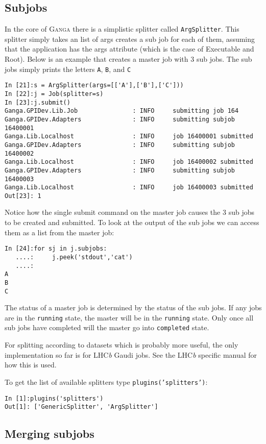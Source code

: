 \documentclass{howto}
\def\ganga {\textsc{Ganga}\xspace}
\def\lhcb {LHC{\em b\/}\xspace}
\begin{document}
\subsection{Subjobs}
\label{sec:subjobs}

In the core of \ganga there is a simplistic splitter called
\texttt{ArgSplitter}. This splitter simply takes an list of args
creates a sub job for each of them, assuming that the application has
the args attribute (which is the case of Executable and Root).  Below
is an example that creates a master job with 3 sub jobs. The sub jobs
simply prints the letters \texttt{A}, \texttt{B}, and \texttt{C}
\begin{verbatim}
In [21]:s = ArgSplitter(args=[['A'],['B'],['C']))
In [22]:j = Job(splitter=s)
In [23]:j.submit()
Ganga.GPIDev.Lib.Job               : INFO     submitting job 164
Ganga.GPIDev.Adapters              : INFO     submitting subjob 16400001
Ganga.Lib.Localhost                : INFO     job 16400001 submitted
Ganga.GPIDev.Adapters              : INFO     submitting subjob 16400002
Ganga.Lib.Localhost                : INFO     job 16400002 submitted
Ganga.GPIDev.Adapters              : INFO     submitting subjob 16400003
Ganga.Lib.Localhost                : INFO     job 16400003 submitted
Out[23]: 1
\end{verbatim}
Notice how the single submit command on the master job causes the 3 sub jobs
to be created and submitted. To look at the output of the sub jobs we can
access them as a list from the master job:
\begin{verbatim}
In [24]:for sj in j.subjobs:
   ....:     j.peek('stdout','cat')
   ....:     
A
B
C
\end{verbatim}

The status of a master job is determined by the status of the sub jobs. If any
jobs are in the \texttt{running} state, the master will be in the
\texttt{running} state. Only once all sub jobs have completed will the master
go into \texttt{completed} state.

For splitting according to datasets which is probably more useful, the only
implementation so far is for \lhcb Gaudi jobs. See the \lhcb specific manual
for how this is used.

To get the list of available splitters type \texttt{plugins('splitters')}:
\begin{verbatim}
In [1]:plugins('splitters')
Out[1]: ['GenericSplitter', 'ArgSplitter']
\end{verbatim}

\subsection{Merging subjobs}
\end{document}
